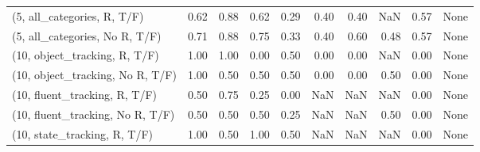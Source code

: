 \begin{table*}[h!]
\begin{adjustbox}{width=2\columnwidth,center}
\begin{tabular}{lrrr|rrr|rrr}
(5, all\_categories, R, T/F)          &                      0.62 &                  0.88 &                      0.62 &                          0.29 &                      0.40 &                          0.40 &                                    NaN &                               0.57 &                                  None \\
(5, all\_categories, No R, T/F)       &                      0.71 &                  0.88 &                      0.75 &                          0.33 &                      0.40 &                          0.60 &                                   0.48 &                               0.57 &                                  None \\



\midrule
(10, object\_tracking, R, T/F)         &                      1.00 &                  1.00 &                      0.00 &                          0.50 &                      0.00 &                          0.00 &                                    NaN &                               0.00 &                                  None \\
(10, object\_tracking, No R, T/F)      &                      1.00 &                  0.50 &                      0.50 &                          0.50 &                      0.00 &                          0.00 &                                   0.50 &                               0.00 &                                  None \\
(10, fluent\_tracking, R, T/F)         &                      0.50 &                  0.75 &                      0.25 &                          0.00 &                       NaN &                           NaN &                                    NaN &                               0.00 &                                  None \\
(10, fluent\_tracking, No R, T/F)      &                      0.50 &                  0.50 &                      0.50 &                          0.25 &                       NaN &                           NaN &                                   0.50 &                               0.00 &                                  None \\
(10, state\_tracking, R, T/F)          &                      1.00 &                  0.50 &                      1.00 &                          0.50 &                       NaN &                           NaN &                                    NaN &                               0.00 &                                  None \\

\end{tabular}
\end{adjustbox}
\end{table*}
